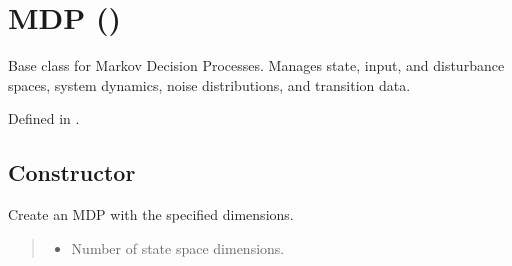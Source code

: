 \documentclass[a4paper,10pt,english]{sphinxmanual}
\begin{document}
\sphinxstepscope


\section{MDP ()}
\label{\detokenize{api/mdp:mdp-class-mdp}}\label{\detokenize{api/mdp::doc}}

\begin{fulllineitems}
\label{\detokenize{api/mdp:_CPPv43MDP}}\label{\detokenize{api/mdp:_CPPv33MDP}}\label{\detokenize{api/mdp:_CPPv23MDP}}\label{\detokenize{api/mdp:MDP}}
\pysigstartsignatures
\pysigstartmultiline
\pysigline
{}
\pysigstopmultiline
\pysigstopsignatures
\sphinxAtStartPar
Base class for Markov Decision Processes. Manages state, input, and disturbance
spaces, system dynamics, noise distributions, and transition data.

\sphinxAtStartPar
Defined in .


\subsection{Constructor}
\label{\detokenize{api/mdp:constructor}}

\begin{fulllineitems}
\label{\detokenize{api/mdp:_CPPv4N3MDP3MDPEKiKiKi}}\label{\detokenize{api/mdp:_CPPv3N3MDP3MDPEKiKiKi}}\label{\detokenize{api/mdp:_CPPv2N3MDP3MDPEKiKiKi}}\label{\detokenize{api/mdp:MDP::MDP__iC.iC.iC}}
\pysigstartsignatures
\pysigstartmultiline
\pysiglinewithargsret
{}
{\sphinxparamcomma {}\sphinxparamcomma {}}
{}
\pysigstopmultiline
\pysigstopsignatures
\sphinxAtStartPar
Create an MDP with the specified dimensions.
\begin{quote}\begin{description}
\begin{itemize}
\item {} 
\sphinxAtStartPar
{} \textendash{} Number of state space dimensions.


\end{itemize}
\end{description}
\end{quote}
\end{fulllineitems}
\end{fulllineitems}
\end{document}
